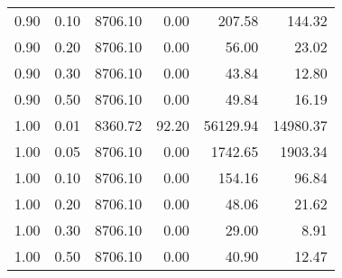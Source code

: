 \begin{table}
\begin{tabular}{rrrrrr}
0.90 & 0.10 & 8706.10 & 0.00 & 207.58 & 144.32 \\
0.90 & 0.20 & 8706.10 & 0.00 & 56.00 & 23.02 \\
0.90 & 0.30 & 8706.10 & 0.00 & 43.84 & 12.80 \\
0.90 & 0.50 & 8706.10 & 0.00 & 49.84 & 16.19 \\
1.00 & 0.01 & 8360.72 & 92.20 & 56129.94 & 14980.37 \\
1.00 & 0.05 & 8706.10 & 0.00 & 1742.65 & 1903.34 \\
1.00 & 0.10 & 8706.10 & 0.00 & 154.16 & 96.84 \\
1.00 & 0.20 & 8706.10 & 0.00 & 48.06 & 21.62 \\
1.00 & 0.30 & 8706.10 & 0.00 & 29.00 & 8.91 \\
1.00 & 0.50 & 8706.10 & 0.00 & 40.90 & 12.47 \\
\bottomrule
\end{tabular}
\end{table}
